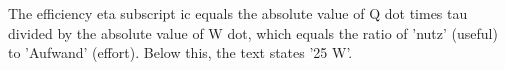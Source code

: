 The efficiency eta subscript ic equals the absolute value of Q dot times tau divided by the absolute value of W dot, which equals the ratio of 'nutz' (useful) to 'Aufwand' (effort). Below this, the text states '25 W'.